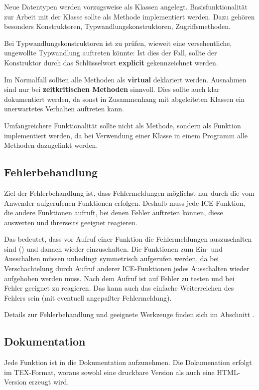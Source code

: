 Neue Datentypen werden vorzugsweise als Klassen angelegt. 
Basisfunktionalität zur Arbeit mit der Klasse sollte als Methode 
implementiert werden. Dazu gehören besonders Konstruktoren, 
Typwandlungskonstruktoren, Zugriffsmethoden.

Bei Typwandlungskonstruktoren ist zu prüfen, wieweit eine versehentliche,
ungewollte Typwandlung auftreten könnte: Ist dies der Fall, sollte der 
Konstruktor durch das Schlüsselwort {\bf explicit} gekennzeichnet werden.

Im Normalfall sollten alle Methoden als {\bf virtual} deklariert
werden. Ausnahmen sind nur bei {\bf zeitkritischen Methoden}
sinnvoll. Dies sollte auch klar dokumentiert werden, da sonst in 
Zusammenhang mit abgeleiteten Klassen ein unerwartetes Verhalten 
auftreten kann.

Umfangreichere Funktionalität sollte nicht als Methode, sondern als Funktion
implementiert werden, da bei Verwendung einer Klasse in einem Programm alle
Methoden dazugelinkt werden.

\subsection{Fehlerbehandlung}
Ziel der Fehlerbehandlung ist, dass Fehlermeldungen möglichst nur durch die
vom Anwender aufgerufenen Funktionen erfolgen. Deshalb muss jede ICE-Funktion,
die andere Funktionen aufruft, bei denen Fehler auftreten können, diese
auswerten und ihrerseits geeignet reagieren.

Das bedeutet, dass vor Aufruf einer Funktion die Fehlermeldungen auszuschalten
sind () und danach wieder einzuschalten. Die Funktionen zum
Ein- und Ausschalten müssen unbedingt symmetrisch aufgerufen werden, da bei 
Verschachtelung durch Aufruf anderer ICE-Funktionen jedes Ausschalten 
wieder aufgehoben werden muss. 
Nach dem Aufruf ist auf Fehler zu testen und bei Fehler geeignet zu 
reagieren. Das kann auch das einfache Weiterreichen des Fehlers sein 
(mit eventuell angepaßter Fehlermeldung).

Details zur Fehlerbehandlung und geeignete Werkzeuge finden sich im Abschnitt
.

\subsection{Dokumentation}
Jede Funktion ist in die Dokumentation aufzunehmen. Die Dokumenation erfolgt
im TEX-Format, woraus sowohl eine druckbare Version als auch eine HTML-Version
erzeugt wird.

